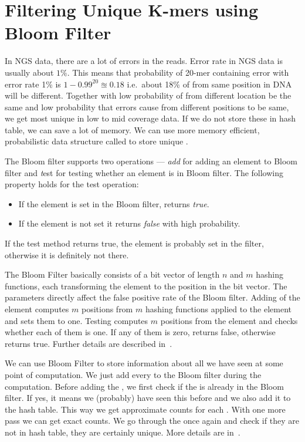 \section{Filtering Unique K-mers using Bloom Filter}

In NGS data, there are a lot of errors in the reads. Error rate in NGS data is usually about $1\%$. This means that probability of 20-mer containing error with error rate 1\% is $1 - 0.99^{20} \approxeq 0.18$ i.e.\ about 18\% of \kmers from same position in DNA will be different. Together with low probability of \kmers from different location be the same and low probability that errors cause \kmers from different positions to be same, we get most \kmers unique in low to mid coverage data. If we do not store these \kmers in hash table, we can save a lot of memory. We can use more memory efficient, probabilistic data structure called \cite{bloomfilter} to store unique \kmers.

The Bloom filter supports two operations --- \emph{add} for adding an element to Bloom filter and \emph test for testing whether an element is in Bloom filter. The following property holds for the test operation:
\begin{itemize}
  \item If the element is set in the Bloom filter, returns \emph{true}.
  \item If the element is not set it returns \emph{false} with high probability.
\end{itemize}
If the test method returns true, the element is probably set in the filter, otherwise it is definitely not there.

The Bloom Filter basically consists of a bit vector of length $n$ and $m$ hashing functions, each transforming the element to the position in the bit vector. The parameters directly affect the false positive rate of the Bloom filter.
Adding of the element computes $m$ positions from $m$ hashing functions applied to the element and sets them to one.
Testing computes $m$ positions from the element and checks whether each of them is one. If any of them is zero, returns false, otherwise returns true. Further details are described in~\cite{bloomfilter}.

We can use Bloom Filter to store information about all \kmers we have seen at some point of computation. We just add every \kmer to the Bloom filter during the computation. Before adding the \kmer, we first check if the \kmer is already in the Bloom filter. If yes, it means we (probably) have seen this \kmer before and we also add it to the hash table. This way we get approximate counts for each \kmer.
With one more pass we can get exact counts. We go through the \kmers once again and check if they are not in hash table, they are certainly unique. More details are in~\cite{bfcounter}.

